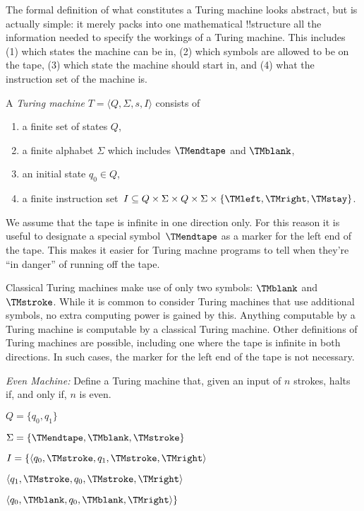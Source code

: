 \documentclass[../../../include/open-logic-section]{subfiles}
\begin{document}

\begin{explain}
The formal definition of what constitutes a Turing machine looks
abstract, but is actually simple: it merely packs into one
mathematical !!{structure} all the information needed to specify the
workings of a Turing machine. This includes (1) which states the
machine can be in, (2) which symbols are allowed to be on the tape, (3)
which state the machine should start in, and (4) what the instruction
set of the machine is.
\end{explain}

\begin{defn}
A \emph{Turing machine} $T = \langle Q, \Sigma, s, I\rangle$ consists of
\begin{enumerate}
\item a finite set of states $Q$,
\item a finite alphabet $\Sigma$ which includes $\TMendtape$ and
  $\TMblank$,
\item an initial state $q_0 \in Q$,
\item a finite instruction set~$I \subseteq Q \times \Sigma \times Q
  \times \Sigma \times \{\TMleft, \TMright, \TMstay\}$.
\end{enumerate}
\end{defn}

\begin{explain}
We assume that the tape is infinite in one direction only. For this
reason it is useful to designate a special symbol~$\TMendtape$ as
a marker for the left end of the tape. This makes it easier for
Turing machne programs to tell when they're ``in danger'' of running
off the tape. 

Classical Turing machines make use of only two symbols: $\TMblank$ and
$\TMstroke$. While it is common to consider Turing machines that use additional
symbols, no extra computing power is gained by this. Anything computable by
a Turing machine is computable by a classical Turing machine. Other
definitions of Turing machines are possible,
including one where the tape is infinite in both directions. In such cases,
the marker for the left end of the tape is not necessary.
\end{explain}

\begin{ex}
\emph{Even Machine:} Define a Turing machine that, given an input of $n$
strokes, halts if, and only if, $n$ is even.

$Q =  \{ q_0, q_1 \}$

$\Sigma = \{ \TMendtape, \TMblank, \TMstroke \}$

$I = \{ \langle q_0, \TMstroke, q_1, \TMstroke, \TMright \rangle$

	  $\langle q_1, \TMstroke, q_0, \TMstroke, \TMright \rangle$
	  
	  $\langle q_0, \TMblank, q_0, \TMblank, \TMright \rangle \}$

\end{ex}
\end{document}
